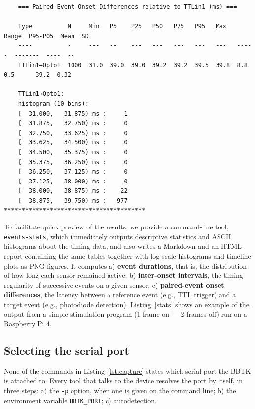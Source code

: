 \documentclass[jou,a4paper]{apa7}
\begin{document}
\begin{lstlisting}
	=== Paired-Event Onset Differences relative to TTLin1 (ms) ===
	
	Type          N     Min   P5    P25   P50   P75   P95   Max   Range  P95-P05  Mean  SD
	----          -     ---   --    ---   ---   ---   ---   ---   -----  -------  ----  --
	TTLin1→Opto1  1000  31.0  39.0  39.0  39.2  39.2  39.5  39.8  8.8    0.5      39.2  0.32
	
	TTLin1→Opto1:
	histogram (10 bins):
	[  31.000,   31.875) ms :     1
	[  31.875,   32.750) ms :     0
	[  32.750,   33.625) ms :     0
	[  33.625,   34.500) ms :     0
	[  34.500,   35.375) ms :     0
	[  35.375,   36.250) ms :     0
	[  36.250,   37.125) ms :     0
	[  37.125,   38.000) ms :     0
	[  38.000,   38.875) ms :    22
	[  38.875,   39.750) ms :   977  ****************************************
\end{lstlisting}




To facilitate quick preview of the results, we provide a command-line tool,
\texttt{events-stats}, which immediately outputs descriptive
statistics and ASCII histograms about the timing data, and also writes
a Markdown and an HTML report containing the same tables together with
log-scale histograms and timeline plots as PNG figures. It computes a)
\textbf{event durations}, that is, the distribution of how long each
sensor remained active; b) \textbf{inter-onset intervals}, the timing
regularity of successive events on a given sensor; c)
\textbf{paired-event onset differences}, the latency between a
reference event (e.g., TTL trigger) and a target event (e.g.,
photodiode detection). Listing~\ref{stats} shows an example of the
output from a simple stimulation program (1 frame on --- 2 frames off)
run on a Raspberry Pi 4.


\subsection{Selecting the serial port}

None of the commands in Listing~\ref{lst:capture} states which serial
port the BBTK is attached to. Every tool that talks to the device
resolves the port by itself, in three steps: a) the \texttt{-p}
option, when one is given on the command line; b) the environment
variable \texttt{BBTK\_PORT}; c) autodetection.
\end{document}
